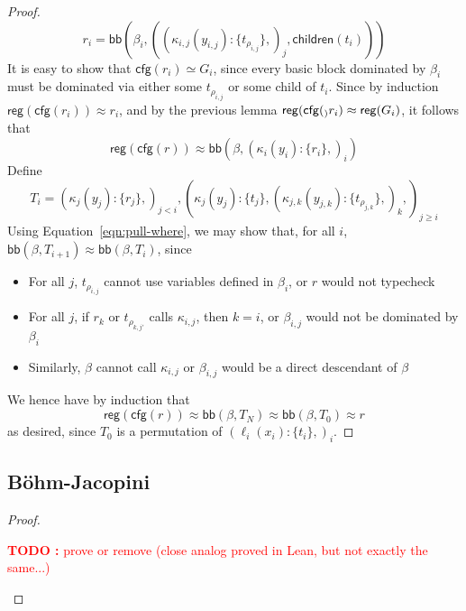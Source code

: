 \documentclass[acmsmall,screen,review]{acmart}
\newcounter{todos}
\newcommand{\TODO}[1]{{
  \stepcounter{todos}
  \begin{center}\large{\textcolor{red}{\textbf{TODO \arabic{todos}:} #1}}\end{center}
}}
\newcommand{\ms}[1]{\ensuremath{\mathsf{#1}}}
\newcommand{\lto}{:}
\newcommand{\wbranch}[3]{#1(#2) \lto \{#3\}}
\newcommand{\teqv}{\approx}
\newcommand{\todom}[1]{\ms{children}(#1)}
\newcommand{\tocfg}[1]{\ms{cfg}(#1)}
\newcommand{\adddom}[2]{\ms{bb}(#1, #2)}
\newcommand{\toreg}[1]{\ms{reg}(#1)}
\begin{document}
\begin{proof}
\begin{equation}
    r_i = \adddom{\beta_i}{
      ((\wbranch{\kappa_{i, j}}{y_{i, j}}{t_{\rho_{i, j}}},)_j, \todom{t_i})
    }
  \end{equation}
  It is easy to show that $\tocfg{r_i} \simeq G_i$, since every basic block dominated by $\beta_i$
  must be dominated via either some $t_{\rho_{i, j}}$ or some child of $t_i$. Since by induction
  $\toreg{\tocfg{r_i}} \teqv r_i$, and by the previous lemma $\toreg{\tocfg_r_i} \teqv \toreg{G_i}$,
  it follows that
  \begin{equation}
    \toreg{\tocfg{r}}
    \teqv \adddom{\beta}{(\wbranch{\kappa_i}{y_i}{r_i},)_i}
  \end{equation}
  Define
  \begin{equation}
    T_i = (\wbranch{\kappa_j}{y_j}{r_j},)_{j < i}, 
      (\wbranch{\kappa_j}{y_j}{t_j}, 
      (\wbranch{\kappa_{j, k}}{y_{j, k}}{t_{\rho_{j, k}}},)_k,)_{j \geq i}
  \end{equation}
  Using Equation~\ref{eqn:pull-where}, we may show that, for all $i$, $\adddom{\beta}{T_{i + 1}}
  \teqv \adddom{\beta}{T_i}$, since
  \begin{itemize}
    \item For all $j$, $t_{\rho_{i, j}}$ cannot use variables defined in $\beta_i$, or $r$ would not
    typecheck
    \item For all $j$, if $r_k$ or $t_{\rho_{k, j'}}$ calls $\kappa_{i, j}$, then $k = i$, or
    $\beta_{i, j}$ would not be dominated by $\beta_i$
    \item Similarly, $\beta$ cannot call $\kappa_{i, j}$ or $\beta_{i, j}$ would be a direct
    descendant of $\beta$
  \end{itemize}
  We hence have by induction that
  \begin{equation}
    \toreg{\tocfg{r}} \teqv \adddom{\beta}{T_N} \teqv \adddom{\beta}{T_0} \teqv r
  \end{equation}
  as desired, since $T_0$ is a permutation of $(\wbranch{\ell_i}{x_i}{t_i},)_i$.
\end{proof}

\subsection{B\"ohm-Jacopini}

\bohmjacopini*

\label{proof:bohm-jacopini}

\begin{proof}
  \TODO{prove or remove (close analog proved in Lean, but not exactly the same...)}
\end{proof}
\end{document}

